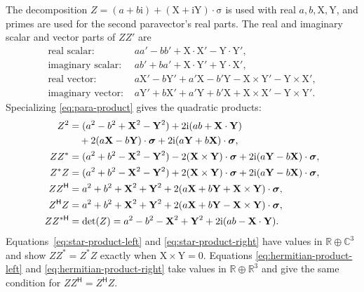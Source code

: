\documentclass[11pt]{article}
\newcommand{\pv}[1]{{#1}}
\newcommand{\vstyle}[1]{{\bm{\mathrm{#1}}}}
\newcommand{\pZ}{\pv{Z}}
\numberwithin{equation}{section}
\newcommand{\R}{\mathbb{R}}
\newcommand{\C}{\mathbb{C}}
\newcommand{\ii}{\mathrm{i}}
\newcommand{\dotprod}{\cdot}
\newcommand{\bsig}{\vstyle{\sigma}}
\newcommand{\bX}{\vstyle{X}}
\newcommand{\bY}{\vstyle{Y}}
\begin{document}
The decomposition $\pZ=(a+b\ii)+(\bX+\ii\bY)\dotprod\bsig$ is used with real
$a,b,\bX,\bY$, and primes are used for the second paravector's real parts.  The real and imaginary
scalar and vector parts of $\pZ \pZ'$ are
\begin{align*}
 \text{real scalar: }&aa'-bb'+\bX\dotprod\bX'-\bY\dotprod\bY',\\
 \text{imaginary scalar: }&ab'+ba'+\bX\dotprod\bY'+\bY\dotprod\bX',\\
 \text{real vector: }&a\bX'-b\bY'+a'\bX-b'\bY
                    -\bX\times\bY'-\bY\times\bX',\\
 \text{imaginary vector: }&a\bY'+b\bX'+a'\bY+b'\bX
                    +\bX\times\bX'-\bY\times\bY'.
\end{align*}
Specializing \eqref{eq:para-product} gives the quadratic products:
\begin{align}
 \pZ^2&=(a^2-b^2+\bX^2-\bY^2)
 +2\ii(ab+\bX\dotprod\bY) \notag\\
 &\quad+2(a\bX-b\bY)\dotprod\bsig
 +2\ii(a\bY+b\bX)\dotprod\bsig, \notag\\
 \pZ \pZ^*&=(a^2+b^2-\bX^2-\bY^2)
 -2(\bX\times\bY)\dotprod\bsig
 +2\ii(a\bY-b\bX)\dotprod\bsig,
 \label{eq:star-product-left}\\
 \pZ^*\pZ&=(a^2+b^2-\bX^2-\bY^2)
 +2(\bX\times\bY)\dotprod\bsig
 +2\ii(a\bY-b\bX)\dotprod\bsig,
 \label{eq:star-product-right}\\
 \pZ \pZ^{\mathsf H}&=a^2+b^2+\bX^2+\bY^2
 +2(a\bX+b\bY+\bX\times\bY)\dotprod\bsig,
 \label{eq:hermitian-product-left}\\
 \pZ^{\mathsf H}\pZ&=a^2+b^2+\bX^2+\bY^2
 +2(a\bX+b\bY-\bX\times\bY)\dotprod\bsig,
 \label{eq:hermitian-product-right}\\
 \pZ \pZ^{*\mathsf H}&=\det(\pZ)
 =a^2-b^2-\bX^2+\bY^2
 +2\ii(ab-\bX\dotprod\bY). \notag
\end{align}
Equations~\eqref{eq:star-product-left} and \eqref{eq:star-product-right}
have values in $\R\oplus\C^3$ and show $\pZ \pZ^*=\pZ^*\pZ$ exactly when
$\bX\times\bY=0$.  Equations
\eqref{eq:hermitian-product-left} and \eqref{eq:hermitian-product-right}
take values in $\R\oplus\R^3$ and give the same condition for
$\pZ \pZ^{\mathsf H}=\pZ^{\mathsf H}\pZ$.
\end{document}
